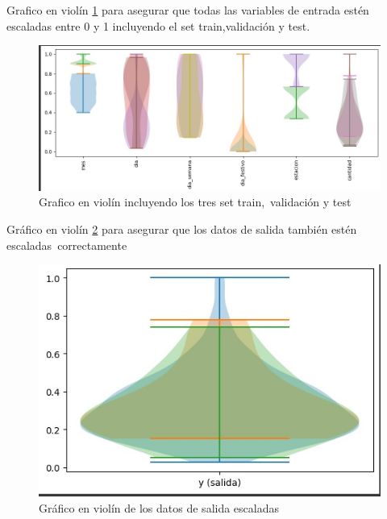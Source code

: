 \vspace{1\baselineskip}
Grafico en violín \ref{fig:grafico_violin} para asegurar que todas las variables de entrada estén escaladas entre 0 y 1 incluyendo el set train,validación y test.
\begin{figure}[H]
  \begin{center}
    \includegraphics[scale=0.50]{./grafico_violin.jpg}
    \caption{Grafico en violín incluyendo los tres set train, validación y test}
    \label{fig:grafico_violin}
  \end{center}
\end{figure}

\vspace{1\baselineskip}
Gráfico en violín \ref{fig:grafico_violin_salida} para asegurar que los datos de salida también estén escaladas correctamente
\begin{figure}[H]
  \begin{center}
    \includegraphics[scale=0.50]{./grafico_violin_salida.jpg}
    \caption{Gráfico en violín de los datos de salida escaladas}
    \label{fig:grafico_violin_salida}
  \end{center}
\end{figure}

